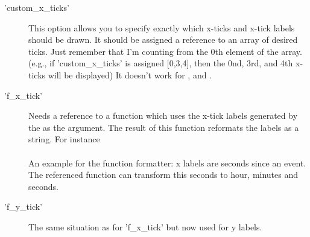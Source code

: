 \begin{description}
\item['custom\_x\_ticks']This option allows you to specify exactly 
            which x-ticks and x-tick labels should be drawn. 
            It should be assigned a reference to an array of desired ticks.  
            Just remember that I'm counting from the 0th element of the array.  
            (e.g., if 'custom\_x\_ticks' is assigned [0,3,4], 
            then the 0nd, 3rd, and 4th x-ticks will be displayed) 
            It doesn't work for ,  and .
            
\item['f\_x\_tick'] Needs a reference to a function 
           which uses the x-tick labels generated by the  as the argument. 
           The result of this function reformats the labels as a string. 
           For instance\\
           \\
           An example for the function formatter: x labels are seconds since an event. 
           The referenced function can transform this seconds to hour, minutes and seconds.

\item['f\_y\_tick']The same situation as for 'f\_x\_tick' but now used for y labels.


\end{description}

